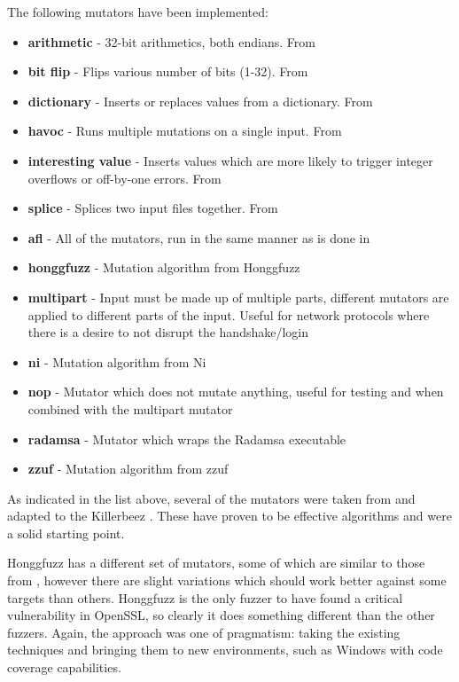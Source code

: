 The following mutators have been implemented:
\begin{itemize}[noitemsep]
\item \textbf{arithmetic} - 32-bit arithmetics, both endians. From \AFL{}
\item \textbf{bit flip} - Flips various number of bits (1-32). From \AFL{}
\item \textbf{dictionary} - Inserts or replaces values from a dictionary. From \AFL{}
\item \textbf{havoc} - Runs multiple mutations on a single input. From \AFL{}
\item \textbf{interesting value} - Inserts values which are more likely to trigger
                                   integer overflows or off-by-one errors. From
                                   \AFL{}
\item \textbf{splice} - Splices two input files together. From \AFL{}
\item \textbf{afl} - All of the \AFL{} mutators, run in the same manner as is
                     done in \AFL{}
\item \textbf{honggfuzz} - Mutation algorithm from Honggfuzz\cite{honggfuzz}
\item \textbf{multipart} - Input must be made up of multiple parts, different
                           mutators are applied to different parts of the
                           input. Useful for network protocols where there is
                           a desire to not disrupt the handshake/login
\item \textbf{ni} - Mutation algorithm from Ni\cite{ni}
\item \textbf{nop} - Mutator which does not mutate anything, useful for
                     testing and when combined with the multipart mutator
\item \textbf{radamsa} - Mutator which wraps the Radamsa\cite{radamsa} executable
\item \textbf{zzuf} - Mutation algorithm from zzuf\cite{zzuf}
\end{itemize}

As indicated in the list above, several of the mutators were taken from \AFL{}
and adapted to the Killerbeez \API{}. These have proven to be effective algorithms
and were a solid starting point.

Honggfuzz has a different set of mutators, some of which are similar to those
from \AFL{}, however there are slight variations which should work better
against some targets than others.  Honggfuzz is the only fuzzer to have found a
critical vulnerability in OpenSSL,\cite{honggfuzz} so clearly it does
something different than the other fuzzers.  Again, the approach was one of pragmatism:
taking the existing techniques and bringing them to new
environments, such as Windows with code coverage capabilities.

